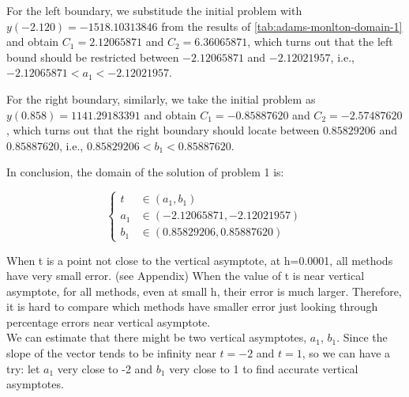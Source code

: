 \documentclass[a4paper]{article}
\begin{document}
    For the left boundary, we substitude the initial problem with $y(-2.120) = -1518.10313846$ from the results of \autoref{tab:adams-monlton-domain-1} and obtain $C_1 = 2.12065871$ and $C_2 = 6.36065871$, which turns out that the left bound should be restricted between $-2.12065871$ and $-2.12021957$, i.e., $-2.12065871 < a_1 < -2.12021957$.
    
    For the right boundary, similarly, we take the initial problem as $y(0.858) = 1141.29183391$ and obtain $C_1 = -0.85887620$ and $C_2 = -2.57487620$, which turns out that the right boundary should locate between $0.85829206$ and $0.85887620$, i.e., $0.85829206 < b_1 < 0.85887620$. 
	
	In conclusion, the domain of the solution of problem 1 is:
	
	$$
	\left\{
    	\begin{aligned}
    	    t &\in (a_1, b_1) \nonumber \\
    	    a_1 &\in (-2.12065871, -2.12021957) \nonumber \\
    	    b_1 &\in (0.85829206, 0.85887620) \nonumber
    	\end{aligned}
	\right.
	$$
	
	
	When t is a point not close to the vertical asymptote, at h=0.0001, all methods have very small error. (see Appendix) When the value of t is near vertical asymptote, for all methods, even at small h, their error is much larger. Therefore, it is hard to compare which methods have smaller error just looking through percentage errors near vertical asymptote. \\
	
	We can estimate that there might be two vertical asymptotes, $a_1$, $b_1$. Since the slope of the vector tends to be infinity near $t=-2$ and $t=1$, so we can have a try: let $a_1$ very close to -2 and $b_1$ very close to 1 to find accurate vertical asymptotes.
	
\end{document}
